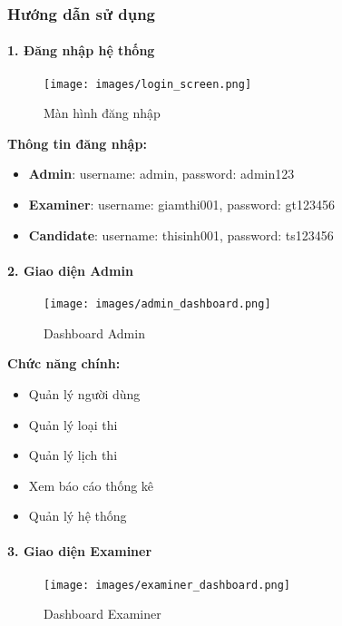 \documentclass[12pt,a4paper]{article}
\begin{document}
\subsubsection{Hướng dẫn sử dụng}

\paragraph{1. Đăng nhập hệ thống}

\begin{figure}[H]
\centering
\texttt{[image: images/login\_screen.png]}
\caption{Màn hình đăng nhập}
\label{fig:login_screen}
\end{figure}

\textbf{Thông tin đăng nhập:}
\begin{itemize}
    \item \textbf{Admin}: username: admin, password: admin123
    \item \textbf{Examiner}: username: giamthi001, password: gt123456
    \item \textbf{Candidate}: username: thisinh001, password: ts123456
\end{itemize}

\paragraph{2. Giao diện Admin}

\begin{figure}[H]
\centering
\texttt{[image: images/admin\_dashboard.png]}
\caption{Dashboard Admin}
\label{fig:admin_dashboard}
\end{figure}

\textbf{Chức năng chính:}
\begin{itemize}
    \item Quản lý người dùng
    \item Quản lý loại thi
    \item Quản lý lịch thi
    \item Xem báo cáo thống kê
    \item Quản lý hệ thống
\end{itemize}

\paragraph{3. Giao diện Examiner}

\begin{figure}[H]
\centering
\texttt{[image: images/examiner\_dashboard.png]}
\caption{Dashboard Examiner}
\label{fig:examiner_dashboard}
\end{figure}
\end{document}
